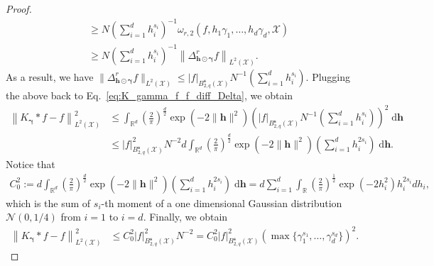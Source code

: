 \documentclass[11pt]{article}
\newcommand{\bgamma}{\boldsymbol{\gamma}}
\newcommand{\calN}{\mathcal{N}}
\newcommand{\calX}{\mathcal{X}}
\newcommand{\R}{\mathbb{R}}
\newcommand{\0}{\mathbf{0}}
\newcommand{\bh}{\boldsymbol{h}}
\newcommand{\bs}{\boldsymbol{s}}
\begin{document}
\begin{appendix}
\begin{proof}
\begin{align*}
    &\geq N \left( \sum_{i=1}^d h_i^{s_i} \right)^{-1} \omega_{r, 2} \left(f, h_1 \gamma_1, \ldots, h_d \gamma_d, \calX \right) \\
    &\geq N \left( \sum_{i=1}^d h_i^{s_i} \right)^{-1} \left\| \Delta_{\bh \odot \bgamma}^r f \right\|_{L^2(\calX)} .
\end{align*}
As a result, we have $ \| \Delta_{\bh \odot \bgamma}^r f\|_{L^2(\calX)} \leq |f|_{B_{2,q}^{\bs}(\calX)} N^{-1} (\sum_{i=1}^d h_i^{s_i})$.
Plugging the above back to Eq.~\eqref{eq:K_gamma_f_f_diff_Delta}, we obtain
\begin{align*}
    \left\| K_{\bgamma} * f - f\right\|_{L^2(\calX)}^2 &\leq \int_{\R^d} \left(\frac{2}{\pi}\right)^{\frac{d}{2}} \exp\left( -2 \| \bh\|^2 \right) \left( |f|_{B_{2,q}^{\bs}(\calX)} N^{-1} \left(\sum_{i=1}^d h_i^{s_i}\right) \right)^2 \;\mathrm{d}\bh \\
    &\leq |f|_{B_{2,q}^{\bs}(\calX)}^2 N^{-2} d \int_{\R^d} \left(\frac{2}{\pi}\right)^{\frac{d}{2}} \exp\left( -2 \| \bh\|^2 \right) \left(\sum_{i=1}^d h_i^{2 s_i}\right) \;\mathrm{d}\bh .
\end{align*}
Notice that
\begin{align*}
    C_0^2 := d \int_{\R^d} \left(\frac{2}{\pi}\right)^{\frac{d}{2}} \exp\left( -2 \| \bh\|^2 \right) \left(\sum_{i=1}^d h_i^{2 s_i}\right) \;\mathrm{d}\bh = d \sum_{i=1}^d \int_{\R} \left(\frac{2}{\pi}\right)^{\frac{1}{2}} \exp\left( -2 h_i^2 \right) h_i^{2 s_i }dh_i,
\end{align*}
which is the sum of $s_i$-th moment of a one dimensional Gaussian distribution $\calN(0, 1/4)$ from $i=1$ to $i=d$. 
Finally, we obtain
\begin{align*}
    \left\| K_{\bgamma} * f - f\right\|_{L^2(\calX)}^2 &\leq C_0^2 |f|_{B_{2,q}^{\bs}(\calX)}^2 N^{-2} = C_0^2 |f|_{B_{2,q}^{\bs}(\calX)}^2 \left( \max\{\gamma_1^{s_1}, \ldots, \gamma_d^{s_d}\} \right)^2 .
\end{align*}
\end{proof}




\end{appendix}
\end{document}
